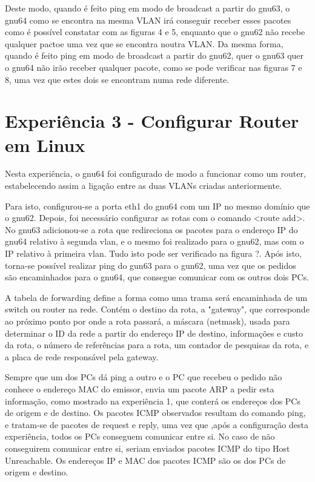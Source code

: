 \documentclass[article, a4paper, 11pt, oneside]{memoir}
\begin{document}
Deste modo, quando é feito ping em modo de broadcast a partir do gnu63, o gnu64 como se encontra na mesma VLAN irá conseguir 
receber esses pacotes como é possível constatar com as figuras 4 e 5, enquanto que o gnu62 não recebe qualquer pactoe uma vez que se encontra noutra VLAN.
Da mesma forma, quando é feito ping em modo de broadcast a partir do gnu62, quer o gnu63 quer o gnu64 não irão receber qualquer pacote, como se pode verificar
nas figuras 7 e 8, uma vez que estes dois se encontram numa rede diferente.


\section{Experiência 3 - Configurar Router em Linux}

Nesta experiência, o gnu64 foi configurado de modo a funcionar como um router, estabelecendo assim a ligação entre as duas VLANs criadas anteriormente.

Para isto, configurou-se a porta eth1 do gnu64 com um IP no mesmo domínio que o gnu62. Depois, foi necessário configurar as rotas com o comando <route add>. No gnu63 adicionou-se a rota
que redireciona os pacotes para o endereço IP do gnu64 relativo à segunda vlan, e o mesmo foi realizado para o gnu62, mas com o IP relativo à primeira vlan.
Tudo isto pode ser verificado na figura ?.
Após isto, torna-se possível realizar ping do gun63 para o gun62, uma vez que os pedidos são encaminhados para o gnu64, que consegue comunicar com os outros dois PCs.

A tabela de forwarding define a forma como uma trama será encaminhada de um switch ou router na rede. Contém o destino da rota, a "gateway", que corresponde ao próximo ponto por onde a rota passará,
a máscara (netmask), usada para determinar o ID da rede a partir do endereço IP de destino, informações e custo da rota, o número de referências para a rota, um contador de pesquisas da rota, e a placa de rede responsável pela gateway.

Sempre que um dos PCs dá ping a outro e o PC que recebeu o pedido não conhece o endereço MAC do emissor, envia um pacote ARP a pedir esta informação, como mostrado na experiência 1, que conterá os endereços dos PCs de origem e de destino.
Os pacotes ICMP observados resultam do comando ping, e tratam-se de pacotes de request e reply, uma vez que ,após a configuração desta experiência, todos os PCs conseguem comunicar entre si.
No caso de não conseguirem comunicar entre si, seriam enviados pacotes ICMP do tipo Host Unreachable.
Os endereços IP e MAC dos pacotes ICMP são os dos PCs de origem e destino.
\end{document}
